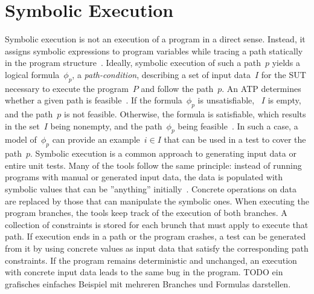 \documentclass[paper=a4,%
  twoside,%
  BCOR4mm,%
  abstract=true,%
  toc=bibliography,%
  chapterprefix=true,%
  toc=bibliographynumbered,%
  open=right,%
  english,%
  pagesize=pdftex]{scrreprt}
\begin{document}
\section{Symbolic Execution}
Symbolic execution is not an execution of a program in a direct sense. Instead, it assigns symbolic expressions to program variables while tracing a path statically in the program structure~\cite{McMinn_2004}. Ideally, symbolic execution of such a path~$p$ yields a logical formula~$\phi_{p}$, a \emph{path-condition}, describing a set of input data~$I$ for the \ac{SUT} necessary to execute the program~$P$ and follow the path~$p$. An \ac{ATP} determines whether a given path is feasible~\cite{Clarke1976,King1976}. If the formula~$\phi_{p}$ is unsatisfiable, ~$I$ is empty, and the path~$p$ is not feasible. Otherwise, the formula is satisfiable, which results in the set~$I$ being nonempty, and the path~$\phi_{p}$ being feasible~\cite{Ball2015}. In such a case, a model of~$\phi_{p}$ can provide an example~$i \in I$ that can be used in a test to cover the path~$p$. Symbolic execution is a common approach to generating input data or entire unit tests. Many of the tools follow the same principle: instead of running programs with manual or generated input data, the data is populated with symbolic values that can be ''anything'' initially~\cite{cadar2008klee}. Concrete operations on data are replaced by those that can manipulate the symbolic ones. When executing the program branches, the tools keep track of the execution of both branches. A collection of constraints is stored for each brunch that must apply to execute that path. If execution ends in a path or the program crashes, a test can be generated from it by using concrete values as input data that satisfy the corresponding path constraints. If the program remains deterministic and unchanged, an execution with concrete input data leads to the same bug in the program. TODO ein grafisches einfaches Beispiel mit mehreren Branches und Formulas darstellen.
\end{document}
